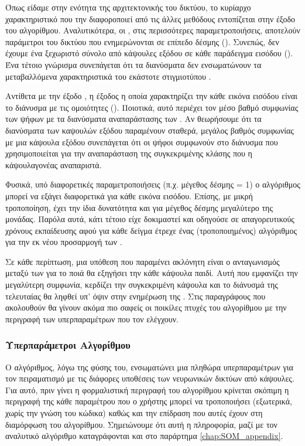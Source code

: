 Όπως είδαμε στην ενότητα της αρχιτεκτονικής του δικτύου, το κυρίαρχο χαρακτηριστικό που την διαφοροποιεί από τις άλλες μεθόδους εντοπίζεται στην έξοδο του αλγορίθμου. Αναλυτικότερα, οι , στις περισσότερες παραμετροποιήσεις, αποτελούν παράμετροι του δικτύου που ενημερώνονται σε επίπεδο δέσμης (). Συνεπώς, δεν έχουμε ένα ξεχωριστό σύνολο από κάψουλες εξόδου σε κάθε παράδειγμα εισόδου (). Ένα τέτοιο γνώρισμα συνεπάγεται ότι τα διανύσματα  δεν ενσωματώνουν τα μεταβαλλόμενα χαρακτηριστικά του εκάστοτε στιγμιοτύπου .\par

Αντίθετα με την έξοδο , η έξοδος η οποία χαρακτηρίζει την κάθε εικόνα εισόδου είναι το διάνυσμα με τις ομοιότητες (). Ποιοτικά, αυτό περιέχει τον μέσο βαθμό συμφωνίας των ψήφων με τα διανύσματα αναπαράστασης των . Αν θεωρήσουμε ότι τα διανύσματα των καψουλών εξόδου παραμένουν σταθερά, μεγάλος βαθμός συμφωνίας με μια κάψουλα εξόδου συνεπάγεται ότι οι ψήφοι συμφωνούν στο διάνυσμα που χρησιμοποιείται για την αναπαράσταση της συγκεκριμένης κλάσης που η κάψουλα\textendash γονέας αναπαριστά.\par

Φυσικά, υπό διαφορετικές παραμετροποιήσεις (π.χ. μέγεθος δέσμης = 1) ο αλγόριθμος μπορεί να εξάγει διαφορετικά  για κάθε εικόνα εισόδου. Επίσης, με μικρή τροποποίηση, έχει την ίδια δυνατότητα και για μέγεθος δέσμης μεγαλύτερο της μονάδας. Παρόλα αυτά, κάτι τέτοιο είχε δοκιμαστεί και οδηγούσε σε απαγορευτικούς χρόνους εκπαίδευσης αφού για κάθε δείγμα έτρεχε ένας (τροποποιημένος) αλγόριθμος  για την εκ νέου προσαρμογή των .\par 

Σε κάθε περίπτωση, μια υπόθεση που παραμένει ακλόνητη είναι ο ανταγωνισμός μεταξύ των  για το ποιά θα εξηγήσει την κάθε κάψουλα παιδί. Αυτή που εμφανίζει την μεγαλύτερη συμφωνία, κερδίζει την συγκεκριμένη κάψουλα και το διάνυσμά της τελευταίας θα ληφθεί υπ' όψιν στην ενημέρωση της . Στις παραγράφους που ακολουθούν θα γίνουν ακόμα πιο σαφείς οι ποικίλες πτυχές του αλγορίθμου με την περιγραφή των υπερπαραμέτρων που τον ελέγχουν.
 
\subsubsection{Υπερπαράμετροι Αλγορίθμου}

Ο αλγόριθμος, λόγω της φύσης του, ενσωματώνει μια πληθώρα υπερπαραμέτρων για τον πειραματισμό με τις διάφορες υποθέσεις των νευρωνικών δικτύων από κάψουλες. Για αυτό, πριν γίνει η φορμαλιστική περιγραφή του αλγορίθμου κρίνεται σκόπιμη η περιγραφή της κάθε παραμέτρου που ο χρήστης μπορεί να τροποποιήσει (εξωτερικά, χωρίς την γνώση του κώδικα) καθώς και την επίδραση που αυτές έχουν στη διαμόρφωση του αλγορίθμου. Σημειώνουμε ότι αυτή η πληροφορία, μαζί με τον αναλυτικό αλγόριθμο καταγράφονται και στο παράρτημα \ref{chap:SOM_appendix}.\par

